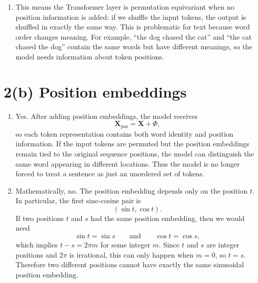 \begin{answer}
\begin{enumerate}
    \item This means the Transformer layer is permutation equivariant when no position information is added: if we shuffle the input tokens, the output is shuffled in exactly the same way. This is problematic for text because word order changes meaning. For example, ``the dog chased the cat'' and ``the cat chased the dog'' contain the same words but have different meanings, so the model needs information about token positions.
\end{enumerate}

\section*{2(b) Position embeddings}
\begin{enumerate}
    \item Yes. After adding position embeddings, the model receives
    \[
        \mathbf{X}_{\text{pos}} = \mathbf{X} + \Phi,
    \]
    so each token representation contains both word identity and position information. If the input tokens are permuted but the position embeddings remain tied to the original sequence positions, the model can distinguish the same word appearing in different locations. Thus the model is no longer forced to treat a sentence as just an unordered set of tokens.

    \item Mathematically, no. The position embedding depends only on the position $t$. In particular, the first sine-cosine pair is
    \[
        \left(\sin t, \cos t\right).
    \]
    If two positions $t$ and $s$ had the same position embedding, then we would need
    \[
        \sin t = \sin s
        \qquad \text{and} \qquad
        \cos t = \cos s,
    \]
    which implies $t - s = 2\pi m$ for some integer $m$. Since $t$ and $s$ are integer positions and $2\pi$ is irrational, this can only happen when $m=0$, so $t=s$. Therefore two different positions cannot have exactly the same sinusoidal position embedding.
\end{enumerate}
\end{answer}
